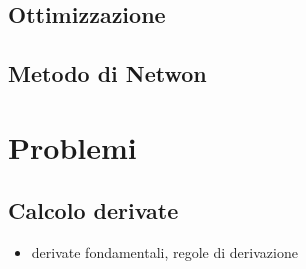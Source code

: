 \documentclass[letterpaper,10pt,italian]{jupyterBook}
\begin{document}
\subsection{Ottimizzazione}
\label{\detokenize{ch/infinitesimal_calculus/derivatives:ottimizzazione}}

\subsection{Metodo di Netwon}
\label{\detokenize{ch/infinitesimal_calculus/derivatives:metodo-di-netwon}}\label{\detokenize{ch/infinitesimal_calculus/derivatives:infinitesimal-calculus-derivatives-applications-newton}}
\sphinxstepscope


\section{Problemi}
\label{\detokenize{ch/infinitesimal_calculus/derivatives-problems:problemi}}\label{\detokenize{ch/infinitesimal_calculus/derivatives-problems:infinitesimal-calculus-derivatives-problems}}\label{\detokenize{ch/infinitesimal_calculus/derivatives-problems::doc}}

\subsection{Calcolo derivate}
\label{\detokenize{ch/infinitesimal_calculus/derivatives-problems:calcolo-derivate}}\label{\detokenize{ch/infinitesimal_calculus/derivatives-problems:infinitesimal-calculus-derivatives-problems-eval}}\begin{itemize}
\item {} 
\sphinxAtStartPar
derivate fondamentali, regole di derivazione

\end{itemize}
 \label{exercise:ch/infinitesimal_calculus/derivatives-problems-exercise-0}
\end{document}
